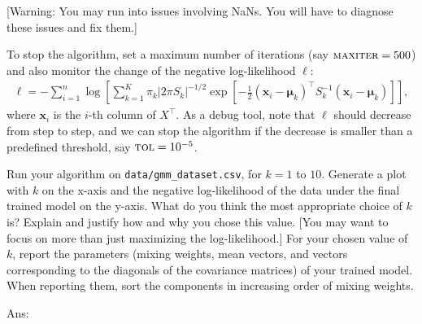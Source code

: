 \documentclass[10pt,letterpaper]{article}
\newcommand{\xv}{\mathbf{x}}
\newcommand{\ans}[1]{{\color{orange}\textsf{Ans}: #1}}
\begin{document}
\begin{exercise}
\begin{enumerate}[label=\alph*)]
		[You might want to review the steps we took in class for a simpler case, and ensure you can derive the updates in . Then adapt the steps to the simpler diagonal case. The solution should look like $s_j = \frac{\sum_{i=1}^n r_{ik} (x_{ij} - \mu_j)^2}{\sum_{i=1}^n r_{ik} } = \frac{\sum_{i=1}^n r_{ik} x_{ij} ^2}{\sum_{i=1}^n r_{ik} } - \mu_j^2$ for the $j$-th diagonal. Multiplying an $n\times p$ matrix with a $p\times m$ matrix costs $O(mnp)$. Do not maintain a diagonal matrix explicitly; using a vector for its diagonal suffices. ]

      [Warning: You may run into issues involving NaNs. You will have to diagnose these issues and fix them.]

		To stop the algorithm, set a maximum number of iterations (say $\textsc{maxiter} = 500$) and also monitor the change of the negative log-likelihood $\ell$:
		\begin{align}
		\ell = -\sum_{i=1}^n \log\left[\sum_{k=1}^K \pi_k |2\pi S_k|^{-1/2} \exp[ -\tfrac{1}{2}(\xv_i -\boldsymbol{\mu}_k)^\top S_k^{-1} (\xv_i - \boldsymbol{\mu}_k ) ]\right],
		\end{align}
		where $\xv_i$ is the $i$-th column of $X^\top$.
		As a debug tool, note that $\ell$ should decrease from step to step, and we can stop the algorithm if the decrease is smaller than a predefined threshold, say $\textsc{tol} = 10^{-5}$.
      \label{ex:gmm}


    Run your algorithm on \texttt{data/gmm\_dataset.csv}, for $k = 1$ to $10$.
    Generate a plot with $k$ on the x-axis and the negative log-likelihood of the data under the final trained model on the y-axis.
    What do you think the most appropriate choice of $k$ is?
    Explain and justify how and why you chose this value.
    [You may want to focus on more than just maximizing the log-likelihood.]
    For your chosen value of $k$, report the parameters (mixing weights, mean vectors, and vectors corresponding to the diagonals of the covariance matrices) of your trained model.
    When reporting them, sort the components in increasing order of mixing weights.


		\ans{}



\end{enumerate}
\end{exercise}
\end{document}
